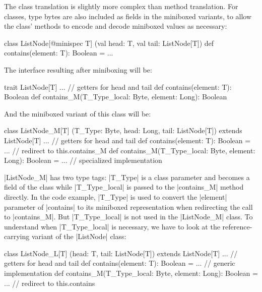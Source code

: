 The class translation is slightly more complex than method translation. For classes, type bytes are also included as fields in the miniboxed variants, to allow the class' methods to encode and decode miniboxed values as necessary: %

\begin{lstlisting-nobreak}
 class ListNode[@minispec T]
   (val head: T, val tail: ListNode[T]) {
   def contains(element: T): Boolean = ...
 }
\end{lstlisting-nobreak}

The interface resulting after miniboxing will be:

\begin{lstlisting-nobreak}
 trait ListNode[T] {
   ... // getters for head and tail
   def contains(element: T): Boolean
   def contains_M(T_Type_local: Byte, element: Long): Boolean
 }
\end{lstlisting-nobreak}

And the miniboxed variant of this class will be:

\begin{lstlisting-nobreak}
 class ListNode_M[T]
   (T_Type: Byte, head: Long, tail: ListNode[T]) extends ListNode[T] {
   ... // getters for head and tail
   def contains(element: T): Boolean =
         ... // redirect to this.contains_M
   def contains_M(T_Type_local: Byte, element: Long): Boolean =
         ... // specialized implementation
 }
\end{lstlisting-nobreak}

|ListNode_M| has two type tags: |T_Type| is a class parameter and becomes a field of the class while |T_Type_local| is passed to the |contains_M| method directly. In the code example, |T_Type| is used to convert the |element| parameter of |contains| to its miniboxed representation when redirecting the call to |contains_M|. But |T_Type_local| is not used in the |ListNode_M| class. To understand when |T_Type_local| is necessary, we have to look at the re\-fe\-rence-carrying variant of the |ListNode| class:

\begin{lstlisting-nobreak}
 class ListNode_L[T]
   (head: T, tail: ListNode[T]) extends ListNode[T] {
   ... // getters for head and tail
   def contains(element: T): Boolean =
         ... // generic implementation
   def contains_M(T_Type_local: Byte, element: Long): Boolean =
         ... // redirect to this.contains
 }
\end{lstlisting-nobreak}

